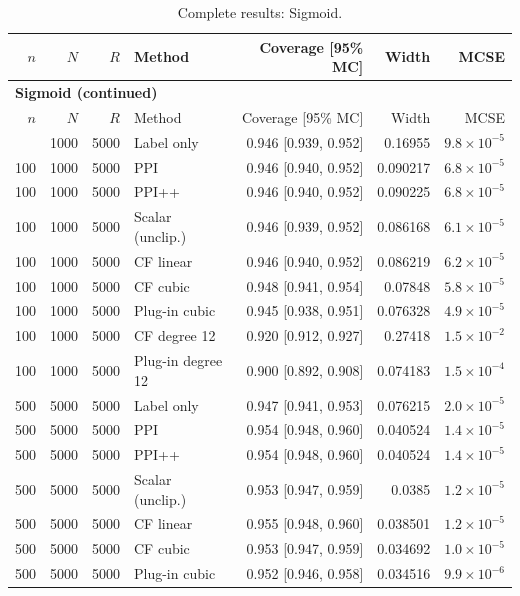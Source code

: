 {\setlength{\tabcolsep}{3pt}\begin{longtable}{rrrlrrr}
\caption{Complete results: Sigmoid.}\\
\toprule $n$ & $N$ & $R$ & Method & Coverage [95\% MC] & Width & MCSE \\
\midrule\endfirsthead
\multicolumn{7}{l}{\textbf{Sigmoid (continued)}}\\
\toprule $n$ & $N$ & $R$ & Method & Coverage [95\% MC] & Width & MCSE \\
\midrule\endhead
\bottomrule\endfoot
100 & 1000 & 5000 & Label only & 0.946 [0.939, 0.952] & 0.16955 & $9.8\times 10^{-5}$ \\
100 & 1000 & 5000 & PPI & 0.946 [0.940, 0.952] & 0.090217 & $6.8\times 10^{-5}$ \\
100 & 1000 & 5000 & PPI++ & 0.946 [0.940, 0.952] & 0.090225 & $6.8\times 10^{-5}$ \\
100 & 1000 & 5000 & Scalar (unclip.) & 0.946 [0.939, 0.952] & 0.086168 & $6.1\times 10^{-5}$ \\
100 & 1000 & 5000 & CF linear & 0.946 [0.940, 0.952] & 0.086219 & $6.2\times 10^{-5}$ \\
100 & 1000 & 5000 & CF cubic & 0.948 [0.941, 0.954] & 0.07848 & $5.8\times 10^{-5}$ \\
100 & 1000 & 5000 & Plug-in cubic & 0.945 [0.938, 0.951] & 0.076328 & $4.9\times 10^{-5}$ \\
100 & 1000 & 5000 & CF degree 12 & 0.920 [0.912, 0.927] & 0.27418 & $1.5\times 10^{-2}$ \\
100 & 1000 & 5000 & Plug-in degree 12 & 0.900 [0.892, 0.908] & 0.074183 & $1.5\times 10^{-4}$ \\
500 & 5000 & 5000 & Label only & 0.947 [0.941, 0.953] & 0.076215 & $2.0\times 10^{-5}$ \\
500 & 5000 & 5000 & PPI & 0.954 [0.948, 0.960] & 0.040524 & $1.4\times 10^{-5}$ \\
500 & 5000 & 5000 & PPI++ & 0.954 [0.948, 0.960] & 0.040524 & $1.4\times 10^{-5}$ \\
500 & 5000 & 5000 & Scalar (unclip.) & 0.953 [0.947, 0.959] & 0.0385 & $1.2\times 10^{-5}$ \\
500 & 5000 & 5000 & CF linear & 0.955 [0.948, 0.960] & 0.038501 & $1.2\times 10^{-5}$ \\
500 & 5000 & 5000 & CF cubic & 0.953 [0.947, 0.959] & 0.034692 & $1.0\times 10^{-5}$ \\
500 & 5000 & 5000 & Plug-in cubic & 0.952 [0.946, 0.958] & 0.034516 & $9.9\times 10^{-6}$ \\

\end{longtable}}
